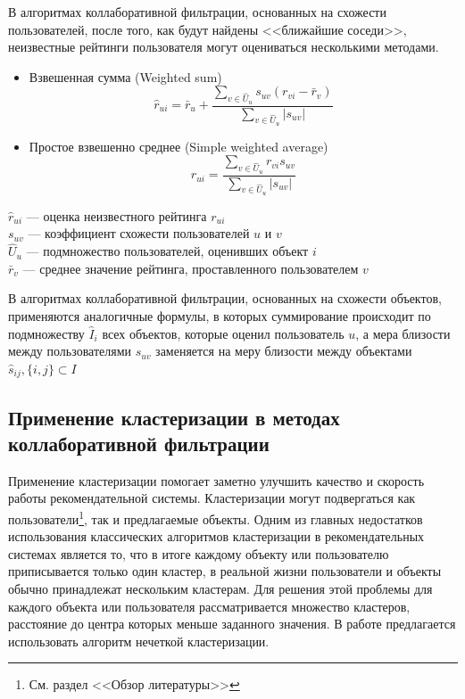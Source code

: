 \documentclass[a4paper, 12pt]{article} %
\begin{document}
В алгоритмах коллаборативной фильтрации, основанных на схожести пользователей, после того, как будут найдены <<ближайшие соседи>>, неизвестные рейтинги пользователя могут оцениваться несколькими методами. 
\begin{itemize}
\item Взвешенная сумма (Weighted sum)
\[
	\hat{r}_{ui} = \bar{r}_{u} + \frac{\sum_{v \in \hat{U}_{u}} s_{uv}(r_{vi} - \bar{r}_v)}{\sum_{v \in \hat{U}_{u}} |s_{uv}|}
\]

\item Простое взвешенно среднее (Simple weighted average)
\[
	\hat{r}_{ui} = \frac{\sum_{v \in \hat{U}_{u}} r_{vi} s_{uv}}{\sum_{v \in \hat{U}_{u}}|s_{uv}|}
\]
\end{itemize}
$\hat{r}_{ui}$ --- оценка неизвестного рейтинга $r_{ui}$
\\
$s_{uv}$ --- коэффициент схожести пользователей $u$ и $v$
\\
$\hat{U}_{u}$ --- подмножество пользователей, оценивших объект $i$
\\
$\bar{r}_v$ --- среднее значение рейтинга, проставленного пользователем $v$
\par В алгоритмах коллаборативной фильтрации, основанных на схожести объектов, применяются аналогичные формулы, в которых суммирование происходит по подмножеству $\hat{ I}_{i}$ всех объектов, которые оценил пользователь $u$, а мера близости между пользователями $s_{uv}$ заменяется на меру близости между объектами $\hat{s}_{ij}, \{i, j\} \subset I$ 


\subsection{Применение кластеризации в методах коллаборативной фильтрации}
Применение кластеризации помогает заметно улучшить качество и скорость работы рекомендательной системы\cite{clustersearch}. Кластеризации могут подвергаться как пользователи\footnote{См. раздел <<Обзор литературы>>}, так и предлагаемые объекты\cite{clusteritemcf}. Одним из главных недостатков использования классических алгоритмов кластеризации в рекомендательных системах является то, что в итоге каждому объекту или пользователю приписывается только один кластер, в реальной жизни пользователи и объекты обычно принадлежат нескольким кластерам. Для решения этой проблемы для каждого объекта или пользователя рассматривается множество кластеров, расстояние до центра которых меньше заданного значения. В работе предлагается использовать алгоритм нечеткой кластеризации.
\end{document}
